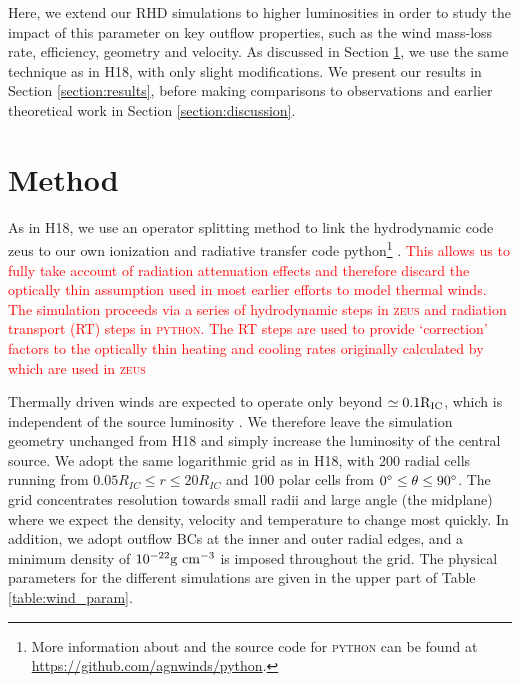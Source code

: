 \documentclass[a4paper,fleqn,usenatbib]{mnras}
\begin{document}
Here, we extend our RHD simulations to higher luminosities in order to
study the impact of this parameter on key outflow properties, such as
the wind mass-loss rate, efficiency, geometry and velocity. 
As discussed in Section \ref{section:method}, we  use the same
technique as in H18, with only slight modifications. We present
our results in Section \ref{section:results}, before making comparisons
to observations and earlier theoretical work in Section
\ref{section:discussion}.

\section{Method }
\label{section:method}

As in H18, we use an operator splitting method to link the hydrodynamic code {\sc zeus} 
\citep[][extended by \citealt{2000ApJ...543..686P}]{1992ApJS...80..753S} to our own ionization and
 radiative transfer code {\sc python}\footnote{More information about and the source code for 
 \textsc{python} can be found at \url{https://github.com/agnwinds/python}.} \citep[][extended by 
  \citealt{2005MNRAS.363..615S}, \citealt{,2013MNRAS.436.1390H} and
 \citealt{2015MNRAS.450.3331M}]{2002ApJ...579..725L}. \textcolor{red}{This allows
 us to fully take account of radiation attenuation effects and therefore discard the optically thin
 assumption used in most earlier efforts to model thermal winds. The simulation proceeds via a
 series of hydrodynamic steps in \textsc{zeus} and radiation transport (RT) steps in \textsc{python}. 
 The RT steps are used to provide `correction' factors to the optically thin heating and cooling
 rates originally calculated by \cite{1994ApJ...435..756B} which are used in \textsc{zeus}}
 
 
 Thermally driven winds are expected to operate only beyond $\simeq 0.1 \rm{R_{IC}}$, which is
 independent of the source luminosity \citep{1996ApJ...461..767W}. We therefore leave the 
 simulation geometry unchanged
from H18 and simply increase the luminosity of the central source. We
adopt the same logarithmic grid as in H18, with 200 radial cells running from $0.05R_{IC} \leq r \leq 20 R_{IC}$
and 100 polar cells from $0\degree \leq \theta \leq 90\degree$. The grid concentrates
resolution towards small radii and large angle (the midplane) 
where we expect the density, velocity and temperature to change most quickly.
In addition, we adopt outflow BCs at the inner and outer radial edges, and a minimum density of $10^{-22}\rm{g~cm^{-3}}$ is imposed throughout the grid.
The physical parameters for the different simulations are 
given in the upper part of Table \ref{table:wind_param}. 
\end{document}
